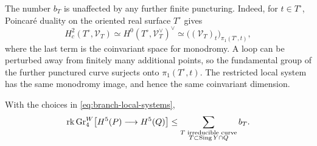 The number $b_T$ is unaffected by any further finite puncturing.
Indeed, for $t\in T^\circ$, Poincar\'e duality on the oriented real
surface $T^\circ$ gives
\[
 H_c^2(T^\circ,\mathcal V_T)
 \simeq H^0(T^\circ,\mathcal V_T^\vee)^\vee
 \simeq \bigl((\mathcal V_T)_t\bigr)_{\pi_1(T^\circ,t)},
\]
where the last term is the coinvariant space for monodromy.  A loop
can be perturbed away from finitely many additional points, so the
fundamental group of the further punctured curve surjects onto
$\pi_1(T^\circ,t)$.  The restricted local system has the same
monodromy image, and hence the same coinvariant dimension.

\begin{lemma}\label{lem:branch-cone}
With the choices in \eqref{eq:branch-local-systems},
\begin{equation}\label{eq:branch-cone-bound}
 \operatorname{rk}\operatorname{Gr}^W_4\bigl[H^5(P)\longrightarrow H^5(Q)\bigr]
 \leq
 \sum_{\substack{T\text{ irreducible curve}\\T\subset\operatorname{Sing} Y\cap Q}} b_T.
\end{equation}
\end{lemma}

